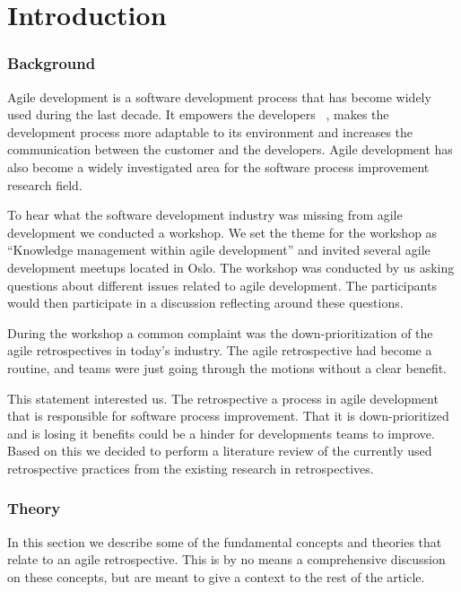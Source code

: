 \documentclass[12pt]{article}
\begin{document}
\tableofcontents
\clearpage

\part{Introduction}
\section{Background}
Agile development is a software development process that has become widely used during the last decade. It empowers the developers ~\cite{Tessem2014}, makes the development process more adaptable to its environment and increases the communication between the customer and the developers. Agile development has also become a widely investigated area for the software process improvement research field.  

To hear what the software development industry was missing from agile development we conducted a workshop. We set the theme for the workshop as ``Knowledge management within agile development'' and invited several agile development meetups located in Oslo. The workshop was conducted by us asking questions about different issues related to agile development. The participants would then participate in a discussion reflecting around these questions. 

During the workshop a common complaint was the down-prioritization of the agile retrospectives in today's industry. The agile retrospective had become a routine, and teams were just going through the motions without a clear benefit.

This statement interested us. The retrospective a process in agile development that is responsible for software process improvement. That it is down-prioritized and is losing it benefits could be a hinder for developments teams to improve. Based on this we decided to perform a literature review of the currently used retrospective practices from the existing research in retrospectives.


\section{Theory}
In this section we describe some of the fundamental concepts and theories that relate to an agile retrospective. This is by no means a comprehensive discussion on these concepts, but are meant to give a context to the rest of the article. 
\end{document}
